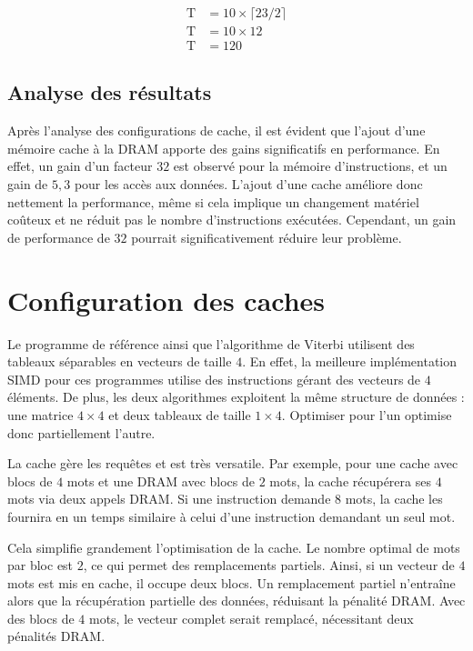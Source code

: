 \documentclass[a11paper]{article}
\begin{document}
\begin{align}
  \text{T} &= 10\times\lceil23/2\rceil \\
  \text{T} &= 10\times12 \\
  \text{T} &= 120
\end{align}

\subsection{Analyse des résultats}

Après l'analyse des configurations de cache, il est évident que l'ajout d'une
mémoire cache à la DRAM apporte des gains significatifs en performance.
En effet, un gain d'un facteur $32$ est observé pour la mémoire
d'instructions, et un gain de $5{,}3$ pour les accès aux données.
L'ajout d'une cache améliore donc nettement la performance, même si
cela implique un changement matériel coûteux et ne réduit pas
le nombre d'instructions exécutées. Cependant, un gain de performance
de $32$ pourrait significativement réduire leur problème.

\section{Configuration des caches}

Le programme de référence ainsi que l'algorithme de Viterbi utilisent des
tableaux séparables en vecteurs de taille $4$. En effet, la meilleure
implémentation SIMD pour ces programmes utilise des instructions gérant
des vecteurs de $4$ éléments. De plus, les deux algorithmes exploitent la
même structure de données : une matrice $4\times4$ et deux tableaux de
taille $1\times4$. Optimiser pour l'un optimise donc partiellement l'autre.

La cache gère les requêtes et est très versatile. Par exemple, pour une
cache avec blocs de $4$ mots et une DRAM avec blocs de $2$ mots,
la cache récupérera ses $4$ mots via deux appels DRAM. Si une instruction
demande $8$ mots, la cache les fournira en un temps similaire à celui
d'une instruction demandant un seul mot.

Cela simplifie grandement l'optimisation de la cache. Le nombre optimal
de mots par bloc est $2$, ce qui permet des remplacements partiels.
Ainsi, si un vecteur de $4$ mots est mis en cache, il occupe deux blocs.
Un remplacement partiel n'entraîne alors que la récupération partielle
des données, réduisant la pénalité DRAM. Avec des blocs de $4$ mots,
le vecteur complet serait remplacé, nécessitant deux pénalités DRAM.
\end{document}
